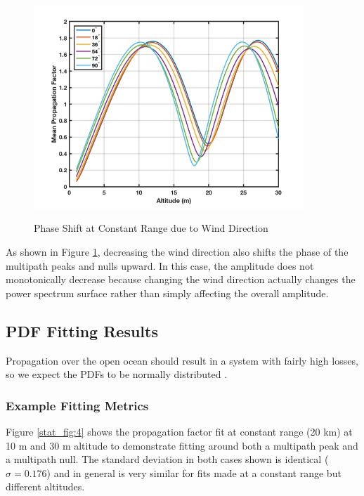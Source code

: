 \begin{figure}[H]
  \begin{center}
\includegraphics[width=4in]{../media/statistics/phase_shift_wind_direction.png}
  \end{center}
  \renewcommand{\baselinestretch}{1} \small\normalsize
  \begin{quote}
    \caption[Phase Shift at Constant Range due to Wind Direction]{Phase Shift at Constant Range due to Wind Direction\label{stat_fig:2zzz}}
  \end{quote}
\end{figure}
\renewcommand{\baselinestretch}{2} \small\normalsize

As shown in Figure \ref{stat_fig:2zzz}, decreasing the wind direction also shifts the phase of the multipath peaks and nulls upward. In this case, the amplitude does not monotonically decrease because changing the wind direction actually changes the power spectrum surface \cite{frazier_ocean} rather than simply affecting the overall amplitude.

\subsection{PDF Fitting Results}
Propagation over the open ocean should result in a system with fairly high losses, so we expect the PDFs to be normally distributed \cite{yeh_first_principles} \cite{yeh_fading}. 

\subsubsection{Example Fitting Metrics}
Figure \ref{stat_fig:4} shows the propagation factor fit at constant range (20 km) at 10 m and 30 m altitude to demonstrate fitting around both a multipath peak and a multipath null. The standard deviation in both cases shown is identical ($\sigma = 0.176$) and in general is very similar for fits made at a constant range but different altitudes.

